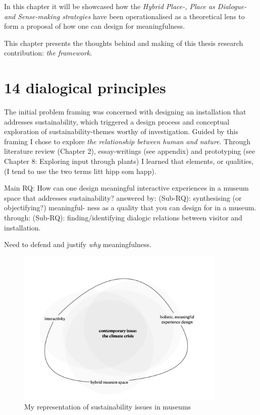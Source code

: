 In this chapter it will be showcased how the \emph{Hybrid Place-, Place as Dialogue- and Sense-making strategies} have been operationalised as a theoretical lens to form a proposal of how one can design for meaningfulness. 

This chapter presents the thoughts behind and making of this thesis research contribution: \emph{the framework}.

\section{14 dialogical principles}

The initial problem framing was concerned with designing an installation that addresses sustainability, which triggered a design process and conceptual exploration of sustainability-themes worthy of investigation. Guided by this framing I chose to explore \emph{the relationship between human and nature}. Through literature review (Chapter 2), essay-writings (see appendix) and prototyping (see Chapter 8: Exploring input through plants) I learned that elements, or qualities, (I tend to use the two terms litt hipp som happ). 


Main RQ: How can one design meaningful interactive experiences in
a museum space that addresses sustainability?
answered by: (Sub-RQ): synthesising (or objectifying?) meaningful-
ness as a quality that you can design for in a museum.
through: (Sub-RQ): finding/identifying dialogic relations between
visitor and installation.

Need to defend and justify \emph{why} meaningfulness. 


\begin{figure}[h]
\includegraphics[width=10cm]{pictures/problem_sphere.png}
\caption{My representation of sustainability issues in museums}
\centering
\end{figure}

